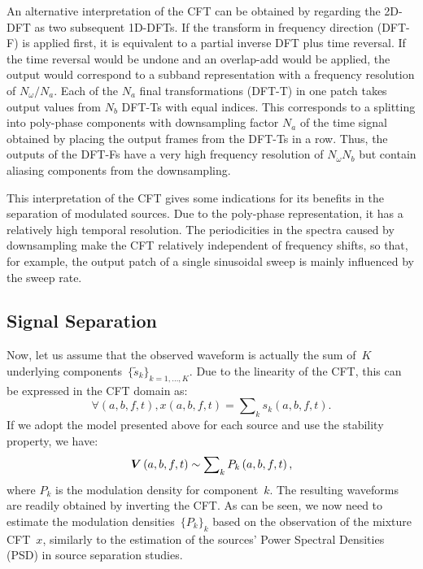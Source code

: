 An alternative interpretation of the CFT can be obtained by regarding the 2D-DFT
as two subsequent 1D-DFTs. If the transform in frequency direction (DFT-F) is
applied first, it is equivalent to a partial inverse DFT plus time reversal. If
the time reversal would be undone and an overlap-add would be applied, the
output would correspond to a subband representation with a frequency resolution
of $N_\omega / N_a$. Each of the $N_a$ final transformations (DFT-T) in one
patch takes output values from $N_b$ DFT-Ts with equal indices. This corresponds
to a splitting into poly-phase components with downsampling factor $N_a$ of the
time signal obtained by placing the output frames from the DFT-Ts in a row.
Thus, the outputs of the DFT-Fs have a very high frequency resolution of
$N_\omega N_b$ but contain aliasing components from the downsampling.
\par
This interpretation of the CFT gives some indications for its benefits in the
separation of modulated sources. Due to the poly-phase representation, it has a
relatively high temporal resolution. The periodicities in the spectra caused
by downsampling make the CFT relatively independent of frequency shifts, so
that, for example, the output patch of a single sinusoidal sweep is mainly
influenced by the sweep rate.


\subsection{Signal Separation}
Now, let us assume that the observed waveform is actually the sum
of~$K$ underlying components~$\{ \tilde{s}_{k}\} _{k=1,\dots,K}$.
Due to the linearity of the CFT, this can be
expressed in the CFT domain as:
$$
\forall\left(a,b,f,t\right),x\left(a,b,f,t\right)=\sum\nolimits_{k}s_{k}\left(a,b,f,t\right).
$$
If we adopt the model presented above for each source
and use the stability property, we have:
$$
{\bm{V}}\left(a,b,f,t\right)\sim \sum\nolimits_{k}P_{k}\left(a,b,f,t\right),
$$
where $P_{k}$ is the modulation density for component~$k$.
The resulting waveforms are readily obtained by inverting the CFT.\@
As can be seen, we now need to estimate the modulation
densities~$\{ P_{k}\}_{k}$ based on the observation
of the mixture CFT~$x$, similarly to the estimation of
 the sources' Power Spectral Densities (PSD)
in source separation studies.

